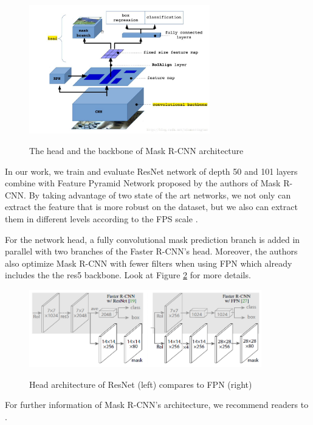 	\begin{figure}[H]
		\centering
		{\includegraphics[width=0.7\textwidth]{./hinhanh/chap5/architecture_mrcnn.png}}
		\caption{The head and the backbone of Mask R-CNN architecture}
		\label{fig:architecture_mrcnn}
	\end{figure}
	
	In our work, we train and evaluate ResNet network of depth 50 and 101 layers \cite{resnet} combine with Feature Pyramid Network proposed by the authors of Mask R-CNN. By taking advantage of two state of the art networks, we not only can extract the feature that is more robust on the dataset, but we also can extract them in different levels according to the FPS scale \cite{maskrcnn}.
	
	For the network head, a fully convolutional mask prediction branch is added in parallel with two branches of the Faster R-CNN's head. Moreover, the authors also optimize Mask R-CNN with fewer filters when using FPN which already includes the the res5 backbone. Look at Figure \ref{fig:fpn_res5} for more details.
	
	\begin{figure}[H]
		\centering
		{\includegraphics[width=0.9\textwidth]{./hinhanh/chap5/fpn_res5.png}}
		\caption{Head architecture of ResNet (left) compares to FPN (right)}
		\label{fig:fpn_res5}
	\end{figure}

\noindent	
	For further information of Mask R-CNN's architecture, we recommend readers to \cite{maskrcnn}.
	
	
	
	
	
